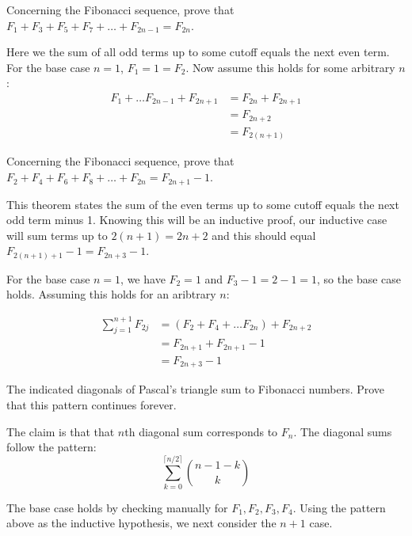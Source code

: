 \documentclass{article}
\begin{document}
\begin{problem}
Concerning the Fibonacci sequence, prove that $F_1 + F_3 + F_5 + F_7 + \ldots + F_{2n-1} = F_{2n}$.
\end{problem}

Here we the sum of all odd terms up to some cutoff equals the next even term. For the base case $n = 1$, $F_1 = 1 = F_2$. Now assume this holds for some arbitrary $n$:
\begin{align*}
    F_1 + \ldots F_{2n-1} + F_{2n+1} & = F_{2n} + F_{2n+1} \\
                                     & = F_{2n+2}          \\
                                     & = F_{2(n+1)}
\end{align*}

\begin{problem}
Concerning the Fibonacci sequence, prove that $F_2 + F_4 + F_6 + F_8 + \ldots + F_{2n} = F_{2n+1} - 1$.
\end{problem}

This theorem states the sum of the even terms up to some cutoff equals the next odd term minus 1. Knowing this will be an inductive proof, our inductive case will sum terms up to $2(n+1) = 2n + 2$ and this should equal $F_{2(n+1) + 1} - 1 = F_{2n+3} - 1$.

For the base case $n = 1$, we have $F_2 = 1$ and $F_3 - 1 = 2 - 1 = 1$, so the base case holds. Assuming this holds for an aribtrary $n$:

\begin{align*}
    \sum_{j=1}^{n+1} F_{2j} & = (F_2 + F_4 + \ldots F_{2n}) + F_{2n+2} \\
                            & = F_{2n+1} + F_{2n + 1} - 1              \\
                            & = F_{2n+3} - 1
\end{align*}

\begin{problem}
The indicated diagonals of Pascal's triangle sum to Fibonacci numbers. Prove that this pattern continues forever.
\end{problem}

The claim is that that $n$th diagonal sum corresponds to $F_n$. The diagonal sums follow the pattern:
$$\sum_{k=0}^{\lceil n/2 \rceil} \binom{n - 1 - k}{k}$$

The base case holds by checking manually for $F_1, F_2, F_3, F_4$. Using the pattern above as the inductive hypothesis, we next consider the $n+1$ case.
\end{document}
